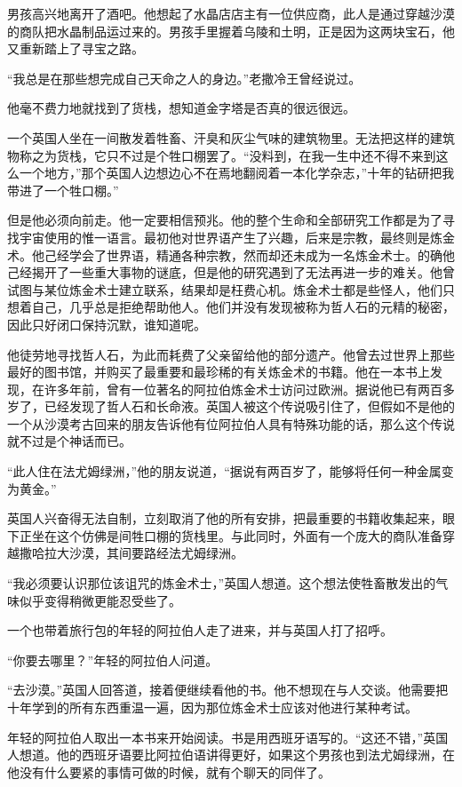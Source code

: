 \documentclass[twoside,openany]{book}
\begin{document}
男孩高兴地离开了酒吧。他想起了水晶店店主有一位供应商，此人是通过穿越沙漠的商队把水晶制品运过来的。男孩手里握着乌陵和土明，正是因为这两块宝石，他又重新踏上了寻宝之路。

“我总是在那些想完成自己天命之人的身边。”老撒冷王曾经说过。

他毫不费力地就找到了货栈，想知道金字塔是否真的很远很远。

一个英国人坐在一间散发着牲畜、汗臭和灰尘气味的建筑物里。无法把这样的建筑物称之为货栈，它只不过是个牲口棚罢了。“没料到，在我一生中还不得不来到这么一个地方，”那个英国人边想边心不在焉地翻阅着一本化学杂志，”十年的钻研把我带进了一个牲口棚。”

但是他必须向前走。他一定要相信预兆。他的整个生命和全部研究工作都是为了寻找宇宙使用的惟一语言。最初他对世界语产生了兴趣，后来是宗教，最终则是炼金术。他己经学会了世界语，精通各种宗教，然而却还未成为一名炼金术士。的确他己经揭开了一些重大事物的谜底，但是他的研究遇到了无法再进一步的难关。他曾试图与某位炼金术士建立联系，结果却是枉费心机。炼金术士都是些怪人，他们只想着自己，几乎总是拒绝帮助他人。他们并没有发现被称为哲人石的元精的秘密，因此只好闭口保持沉默，谁知道呢。

他徒劳地寻找哲人石，为此而耗费了父亲留给他的部分遗产。他曾去过世界上那些最好的图书馆，并购买了最重要和最珍稀的有关炼金术的书籍。他在一本书上发现，在许多年前，曾有一位著名的阿拉伯炼金术士访问过欧洲。据说他已有两百多岁了，已经发现了哲人石和长命液。英国人被这个传说吸引住了，但假如不是他的一个从沙漠考古回来的朋友告诉他有位阿拉伯人具有特殊功能的话，那么这个传说就不过是个神话而已。

“此人住在法尤姆绿洲，”他的朋友说道，“据说有两百岁了，能够将任何一种金属变为黄金。”

英国人兴奋得无法自制，立刻取消了他的所有安排，把最重要的书籍收集起来，眼下正坐在这个仿佛是间牲口棚的货栈里。与此同时，外面有一个庞大的商队准备穿越撒哈拉大沙漠，其间要路经法尤姆绿洲。

“我必须要认识那位该诅咒的炼金术士，”英国人想道。这个想法使牲畜散发出的气味似乎变得稍微更能忍受些了。

一个也带着旅行包的年轻的阿拉伯人走了进来，并与英国人打了招呼。

“你要去哪里？”年轻的阿拉伯人问道。

“去沙漠。”英国人回答道，接着便继续看他的书。他不想现在与人交谈。他需要把十年学到的所有东西重温一遍，因为那位炼金术士应该对他进行某种考试。

年轻的阿拉伯人取出一本书来开始阅读。书是用西班牙语写的。“这还不错，”英国人想道。他的西班牙语要比阿拉伯语讲得更好，如果这个男孩也到法尤姆绿洲，在他没有什么要紧的事情可做的时候，就有个聊天的同伴了。
\end{document}
